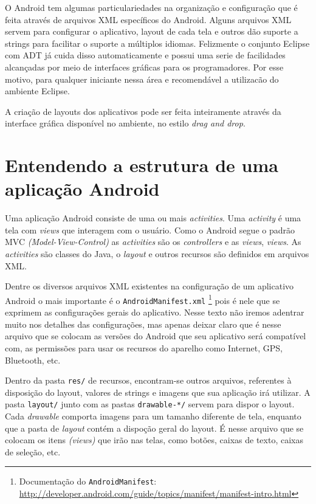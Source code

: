 \documentclass[a4paper,12pt,brazil,doubleside]{book}
\begin{document}
O Android tem algumas particulariedades na organização e configuração que é feita através de arquivos XML específicos do Android. Alguns arquivos XML servem para configurar o aplicativo, layout de cada tela e outros dão suporte a strings para facilitar o suporte a múltiplos idiomas.
Felizmente o conjunto Eclipse com ADT já cuida disso automaticamente e possui uma serie de facilidades alcançadas por meio de interfaces gráficas para os programadores. Por esse motivo, para qualquer iniciante nessa área e recomendável a utilizacão do ambiente Eclipse.

A criação de layouts dos aplicativos pode ser feita inteiramente através da interface gráfica disponível no ambiente, no estilo \textit{drag and drop}. 

\section{Entendendo a estrutura de uma aplicação Android}

Uma aplicação Android consiste de uma ou mais \emph{activities}. Uma \emph{activity} é uma tela com \emph{views} que interagem com o usuário. Como o Android segue o padrão MVC \emph{(Model-View-Control)} as \emph{activities} são os \emph{controllers} e as \emph{views}, \emph{views}. As \emph{activities} são classes do Java, o \emph{layout} e outros recursos são definidos em arquivos XML.

Dentre os diversos arquivos XML existentes na configuração de um aplicativo Android o mais importante é o \texttt{{AndroidManifest.xml}}
\footnote{Documentação do \texttt{AndroidManifest}: \href{The AndroidManifest.xml File}{http://developer.android.com/guide/topics/manifest/manifest-intro.html}}
 pois é nele que se exprimem as configurações gerais do aplicativo. Nesse texto não iremos adentrar muito nos detalhes das configurações, mas apenas deixar claro que é nesse arquivo que se colocam as versões do Android que seu aplicativo será compatível com, as permissões para usar os recursos do aparelho como Internet, GPS, Bluetooth, etc. 

Dentro da pasta \texttt{res/} de recursos, encontram-se outros arquivos, referentes à disposição do layout, valores de strings e imagens que sua aplicação irá utilizar. A pasta \texttt{layout/} junto com as pastas \texttt{drawable-*/} servem para dispor o layout. Cada \textit{drawable} comporta imagens para um tamanho diferente de tela, enquanto que a pasta de \textit{layout} contém a dispoção geral do layout. É nesse arquivo que se colocam os itens \emph{(views)} que irão nas telas, como botões, caixas de texto, caixas de seleção, etc.
\end{document}
